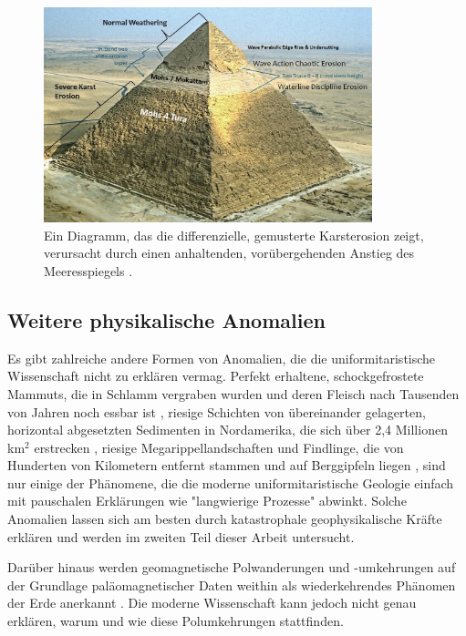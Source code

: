 \documentclass[10pt,twocolumn,letterpaper]{article}
\begin{document}
\begin{figure}[t]
\begin{center}
\includegraphics[width=0.85\textwidth]{khafre.jpg}
\end{center}
   \caption{Ein Diagramm, das die differenzielle, gemusterte Karsterosion zeigt, verursacht durch einen anhaltenden, vorübergehenden Anstieg des Meeresspiegels \cite{27}.}
\label{fig:4}
\end{figure}

\subsection{Weitere physikalische Anomalien}

Es gibt zahlreiche andere Formen von Anomalien, die die uniformitaristische Wissenschaft nicht zu erklären vermag. Perfekt erhaltene, schockgefrostete Mammuts, die in Schlamm vergraben wurden und deren Fleisch nach Tausenden von Jahren noch essbar ist \cite{17,18,19}, riesige Schichten von übereinander gelagerten, horizontal abgesetzten Sedimenten in Nordamerika, die sich über 2,4 Millionen km$^2$ erstrecken \cite{21}, riesige Megarippellandschaften \cite{22} und Findlinge, die von Hunderten von Kilometern entfernt stammen und auf Berggipfeln liegen \cite{23,26}, sind nur einige der Phänomene, die die moderne uniformitaristische Geologie einfach mit pauschalen Erklärungen wie "langwierige Prozesse" abwinkt. Solche Anomalien lassen sich am besten durch katastrophale geophysikalische Kräfte erklären und werden im zweiten Teil dieser Arbeit untersucht.

Darüber hinaus werden geomagnetische Polwanderungen und -umkehrungen auf der Grundlage paläomagnetischer Daten weithin als wiederkehrendes Phänomen der Erde anerkannt \cite{35,40,41}. Die moderne Wissenschaft kann jedoch nicht genau erklären, warum und wie diese Polumkehrungen stattfinden.
\end{document}
